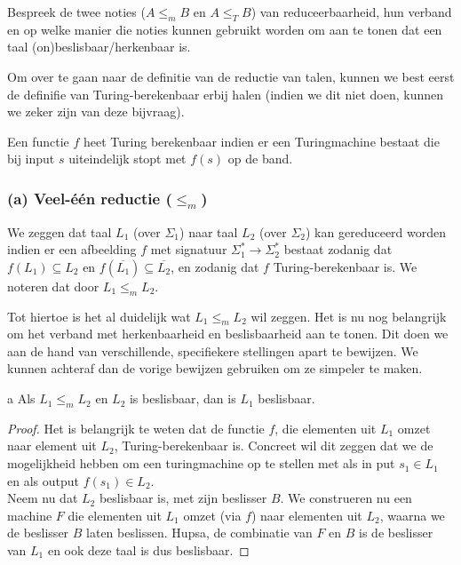 \begin{quest}[Reduceerbaarheid]
	Bespreek de twee noties ($A \leq_m B$ en $A \leq_T B$) van reduceerbaarheid, hun verband en op welke manier die noties kunnen gebruikt worden om aan te tonen dat een taal (on)beslisbaar/herkenbaar is.
\end{quest}

Om over te gaan naar de definitie van de reductie van talen, kunnen we best eerst de definifie van Turing-berekenbaar erbij halen (indien we dit niet doen, kunnen we zeker zijn van deze bijvraag).

\begin{theorem}
	Een functie $f$ heet Turing berekenbaar indien er een Turingmachine bestaat die bij input $s$ uiteindelijk stopt met $f(s)$ op de band.
\end{theorem}

\subsubsection*{(a) Veel-\'e\'en reductie ($\leq_m$)}

\begin{theorem}
	We zeggen dat taal $L_1$ (over $\Sigma_1$) naar taal $L_2$ (over $\Sigma_2$) kan gereduceerd worden indien er een afbeelding $f$ met signatuur $\Sigma^*_1\longrightarrow \Sigma^*_2$ bestaat zodanig dat $f(L_1) \subseteq L_2$ en $f(\overline{L_1}) \subseteq \overline{L_2}$, en zodanig dat $f$ Turing-berekenbaar is. We noteren dat door $L_1 \leq_m L_2$.
\end{theorem}

Tot hiertoe is het al duidelijk wat $L_1 \leq_m L_2$ wil zeggen. Het is nu nog belangrijk om het verband met herkenbaarheid en beslisbaarheid aan te tonen. Dit doen we aan de hand van verschillende, specifiekere stellingen apart te bewijzen. We kunnen achteraf dan de vorige bewijzen gebruiken om ze simpeler te maken.

\begin{theorem}a
	Als $L_1 \leq_m L_2$ en $L_2$ is beslisbaar, dan is $L_1$ beslisbaar.
\end{theorem}

\begin{proof}
	Het is belangrijk te weten dat de functie $f$, die elementen uit $L_1$ omzet naar element uit $L_2$, Turing-berekenbaar is. Concreet wil dit zeggen dat we de mogelijkheid hebben om een turingmachine op te stellen met als in put $s_1 \in L_1$ en als output $f(s_1) \in L_2$.\\
	Neem nu dat $L_2$ beslisbaar is, met zijn beslisser $B$. We construeren  nu een machine $F$ die elementen uit $L_1$ omzet (via $f$) naar elementen uit $L_2$, waarna we de beslisser $B$ laten beslissen. Hupsa, de combinatie van $F$ en $B$ is de beslisser van $L_1$ en ook deze taal is dus beslisbaar.
\end{proof}

